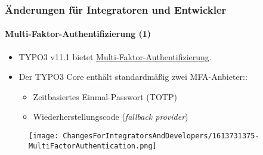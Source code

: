 %

\begin{frame}[fragile]
	\frametitle{Änderungen für Integratoren und Entwickler}
	\framesubtitle{Multi-Faktor-Authentifizierung (1)}


	\begin{itemize}
		\item TYPO3 v11.1 bietet
			\href{https://en.wikipedia.org/wiki/Multi-factor_authentication}{Multi-Faktor-Authentifizierung}.
		\item Der TYPO3 Core enthält standardmäßig zwei MFA-Anbieter::

			\begin{itemize}
				\item Zeitbasiertes Einmal-Passwort (TOTP)
				\item Wiederherstellungscode (\textit{fallback provider})
			\end{itemize}

	\end{itemize}

	\begin{figure}
		\texttt{[image: ChangesForIntegratorsAndDevelopers/1613731375-MultiFactorAuthentication.png]}
	\end{figure}

\end{frame}

